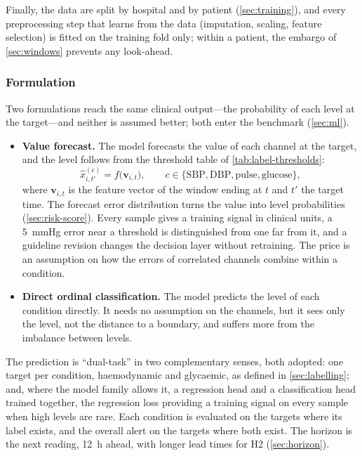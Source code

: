 Finally, the data are split by hospital and by patient (\cref{sec:training}), and every preprocessing step that learns from the data (imputation, scaling, feature selection) is fitted on the training fold only; within a patient, the embargo of \cref{sec:windows} prevents any look-ahead.


\subsubsection{Formulation}\label{sec:formulation}\label{sec:dual-task}\label{sec:horizon-adopted}

Two formulations reach the same clinical output---the probability of each level at the target---and neither is assumed better; both enter the benchmark (\cref{sec:ml}).
\begin{itemize}[nosep]
  \item \textbf{Value forecast.} The model forecasts the value of each channel at the target, and the level follows from the threshold table of \cref{tab:label-thresholds}:
  \begin{equation}
    \hat{x}^{(c)}_{i,t'} = f\bigl(\mathbf{v}_{i,t}\bigr),
    \qquad c \in \{\mathrm{SBP}, \mathrm{DBP}, \text{pulse}, \text{glucose}\},
  \end{equation}
  where $\mathbf{v}_{i,t}$ is the feature vector of the window ending at $t$ and $t'$ the target time. The forecast error distribution turns the value into level probabilities (\cref{sec:risk-score}). Every sample gives a training signal in clinical units, a 5~mmHg error near a threshold is distinguished from one far from it, and a guideline revision changes the decision layer without retraining. The price is an assumption on how the errors of correlated channels combine within a condition.
  \item \textbf{Direct ordinal classification.} The model predicts the level of each condition directly. It needs no assumption on the channels, but it sees only the level, not the distance to a boundary, and suffers more from the imbalance between levels.
\end{itemize}

The prediction is ``dual-task'' in two complementary senses, both adopted: one target per condition, haemodynamic and glycaemic, as defined in \cref{sec:labelling}; and, where the model family allows it, a regression head and a classification head trained together, the regression loss providing a training signal on every sample when high levels are rare. Each condition is evaluated on the targets where its label exists, and the overall alert on the targets where both exist. The horizon is the next reading, 12~h ahead, with longer lead times for H2 (\cref{sec:horizon}).

